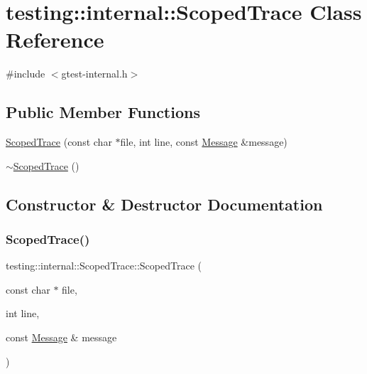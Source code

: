\hypertarget{classtesting_1_1internal_1_1_scoped_trace}{}\section{testing\+:\+:internal\+:\+:Scoped\+Trace Class Reference}
\label{classtesting_1_1internal_1_1_scoped_trace}


{\ttfamily \#include $<$gtest-\/internal.\+h$>$}

\subsection*{Public Member Functions}
\begin{DoxyCompactItemize}
\item 
\hyperlink{classtesting_1_1internal_1_1_scoped_trace_ab965d7010bbbc82c1bef6ebf8748bede}{Scoped\+Trace} (const char $\ast$file, int line, const \hyperlink{classtesting_1_1_message}{Message} \&message)
\item 
\hyperlink{classtesting_1_1internal_1_1_scoped_trace_a658c7c098ff48337058bfa2ccab65881}{$\sim$\+Scoped\+Trace} ()
\end{DoxyCompactItemize}


\subsection{Constructor \& Destructor Documentation}
\mbox{\label{classtesting_1_1internal_1_1_scoped_trace_ab965d7010bbbc82c1bef6ebf8748bede}} 
\subsubsection{\texorpdfstring{Scoped\+Trace()}{ScopedTrace()}}
{\footnotesize\ttfamily testing\+::internal\+::\+Scoped\+Trace\+::\+Scoped\+Trace (\begin{DoxyParamCaption}\item[{const char $\ast$}]{file,  }\item[{int}]{line,  }\item[{const \hyperlink{classtesting_1_1_message}{Message} \&}]{message }\end{DoxyParamCaption})}

